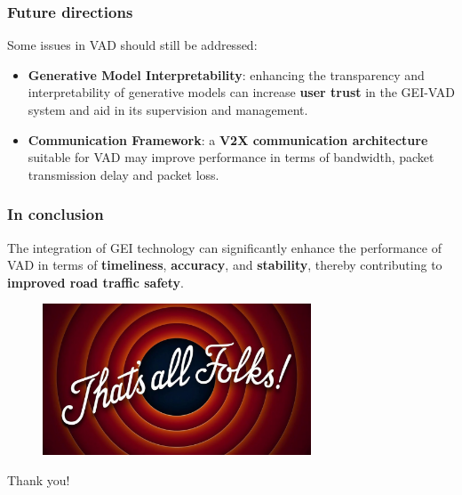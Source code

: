 \documentclass{beamer}
\begin{document}
\begin{frame}
  \frametitle{Future directions}
  Some issues in VAD should still be addressed:
  \begin{itemize}
    \item \textbf{Generative Model Interpretability}: enhancing the transparency 
    and interpretability of generative models can increase \textbf{user trust}
    in the GEI-VAD system and aid in its supervision and
    management.
    \item \textbf{Communication Framework}: a \textbf{V2X communication
    architecture} suitable for VAD may improve
    performance in terms of bandwidth, packet transmission delay and packet loss.
  \end{itemize}
\end{frame}


\begin{frame}
  \frametitle{In conclusion}
  The integration of GEI technology can significantly enhance
  the performance of VAD in terms of \textbf{timeliness}, \textbf{accuracy}, and
  \textbf{stability}, thereby contributing to \textbf{improved road traffic safety}.
\end{frame}
\begin{frame}

  \begin{figure}[t]
    \includegraphics[width=8cm]{images/ending.png}
    \centering
    \end{figure}

    \vspace{0.2cm}


  \begin{center}
    \begin{Large}
      Thank you!
    \end{Large}
  \end{center}
    
\end{frame}
\end{document}
